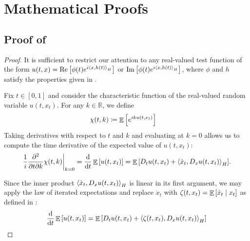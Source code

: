 \chapter{Mathematical Proofs} \label{app:A}

\section{Proof of }\label{prf:lem:fpmarg}
\restatelemfpmarg*

\begin{proof}
  It is sufficient to restrict our attention to any real-valued test function of the form \(u(t, x) = \operatorname{Re}\qty[\phi(t) e^{i \ev{x, h(t)}_{H}}]\) or \(\operatorname{Im}\qty[\phi(t) e^{i \ev{x, h(t)}_{H}}]\), where \(\phi\) and \(h\) satisfy the properties given in .

  Fix \(t \in [0,1]\) and consider the characteristic function of the real-valued random variable \(u(t, x_{t})\). For any \(k \in \mathbb{R}\), we define
  \begin{align}
    \chi(t, k) &\coloneqq \mathop{\mathbb{E}}\qty[e^{i k u(t, x_{t})}]
  \end{align}
  Taking derivatives with respect to \(t\) and \(k\) and evaluating at \(k=0\) allows us to compute the time derivative of the expected value of \(u(t, x_{t})\):
  \begin{equation}
    \eval{\frac{1}{i} \pdv[2]{}{t}{k} \chi(t, k)}_{k=0} = \dv{t} \mathop{\mathbb{E}}\qty[u(t, x_{t})] = \mathop{\mathbb{E}}\qty[D_{t} u(t, x_{t}) + \ev{ \dot{x}_{t}, D_{x}u(t, x_{t})}_{H}].
  \end{equation}

  Since the inner product \(\ev{ \dot{x}_{t}, D_{x} u(t, x_{t})}_{H}\) is linear in its first argument, we may apply the law of iterated expectations and replace \(\dot{x}_{t}\) with \(\zeta(t, x_{t}) = \mathop{\mathbb{E}}\qty[ \dot{x}_{t} \mid x_{t}]\) as defined in :
  \[
    \dv{t} \mathop{\mathbb{E}}\qty[u(t, x_{t})] = \mathop{\mathbb{E}}\qty[D_{t} u(t, x_{t}) + \ev{  \zeta(t, x_{t}), D_{x} u(t, x_{t})}_{H}]
  \]


\end{proof}
